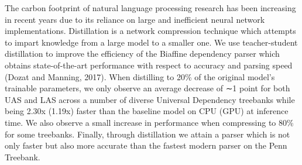 The carbon footprint of natural language processing research has been increasing in recent years due to its reliance on large and inefficient neural network implementations. Distillation is a network compression technique which attempts to impart knowledge from a large model to a smaller one. We use teacher-student distillation to improve the efficiency of the Biaffine dependency parser which obtains state-of-the-art performance with respect to accuracy and parsing speed (Dozat and Manning, 2017). When distilling to 20\% of the original model's trainable parameters, we only observe an average decrease of ∼1 point for both UAS and LAS across a number of diverse Universal Dependency treebanks while being 2.30x (1.19x) faster than the baseline model on CPU (GPU) at inference time. We also observe a small increase in performance when compressing to 80\% for some treebanks. Finally, through distillation we attain a parser which is not only faster but also more accurate than the fastest modern parser on the Penn Treebank.
